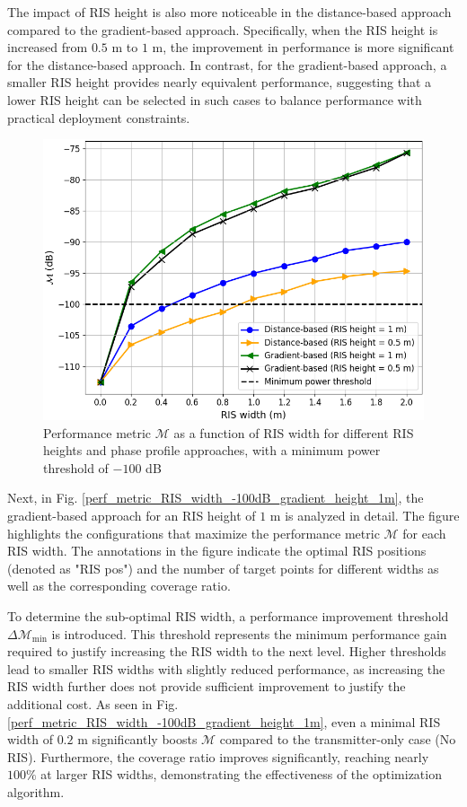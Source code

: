 \documentclass{IEEEoj}
\begin{document}
The impact of RIS height is also more noticeable in the distance-based approach compared to the gradient-based approach. Specifically, when the RIS height is increased from $0.5$ m to $1$ m, the improvement in performance is more significant for the distance-based approach. In contrast, for the gradient-based approach, a smaller RIS height provides nearly equivalent performance, suggesting that a lower RIS height can be selected in such cases to balance performance with practical deployment constraints.

\begin{figure}
	\centering
	\includegraphics[width=\linewidth]{Sim_Results/perf_metric_RIS_width_multiple_curves_-100dB.png}
	\caption{Performance metric $\mathcal{M}$ as a function of RIS width for different RIS heights and phase profile approaches, with a minimum power threshold of $-100$ dB}
	\label{perf_metric_RIS_width_multiple_curves_-100dB}
\end{figure}

Next, in Fig. \ref{perf_metric_RIS_width_-100dB_gradient_height_1m}, the gradient-based approach for an RIS height of $1$ m is analyzed in detail. The figure highlights the configurations that maximize the performance metric $\mathcal{M}$ for each RIS width. The annotations in the figure indicate the optimal RIS positions (denoted as "RIS pos") and the number of target points for different widths as well as the corresponding coverage ratio. 

To determine the sub-optimal RIS width, a performance improvement threshold $\Delta \mathcal{M}_{\text{min}}$ is introduced. This threshold represents the minimum performance gain required to justify increasing the RIS width to the next level. Higher thresholds lead to smaller RIS widths with slightly reduced performance, as increasing the RIS width further does not provide sufficient improvement to justify the additional cost. As seen in Fig. \ref{perf_metric_RIS_width_-100dB_gradient_height_1m}, even a minimal RIS width of $0.2$ m significantly boosts $\mathcal{M}$ compared to the transmitter-only case (No RIS). Furthermore, the coverage ratio improves significantly, reaching nearly $100\%$ at larger RIS widths, demonstrating the effectiveness of the optimization algorithm.
\end{document}
